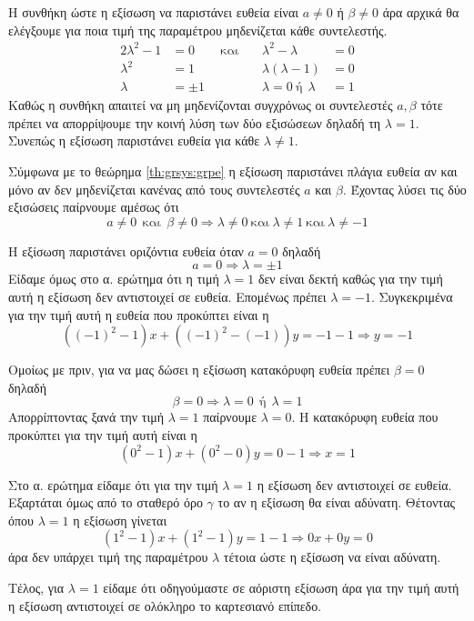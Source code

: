 \begin{alist}
\item Η συνθήκη ώστε η εξίσωση να παριστάνει ευθεία είναι $ a\neq 0 $ ή $ \beta\neq 0 $ άρα αρχικά θα ελέγξουμε για ποια τιμή της παραμέτρου μηδενίζεται κάθε συντελεστής.
\begin{alignat*}{2}
\lambda^2-1&= 0\qquad\textrm{και}\quad&\lambda^2-\lambda&= 0\\
\lambda^2&= 1&\lambda(\lambda-1)&= 0\\
\lambda&=\pm 1&\lambda= 0\ \textrm{ή}\ \  \lambda&= 1
\end{alignat*}
Καθώς η συνθήκη απαιτεί να μη μηδενίζονται συγχρόνως οι συντελεστές $ a,\beta $ τότε πρέπει να απορρίψουμε την κοινή λύση των δύο εξισώσεων δηλαδή τη $ \lambda=1 $. Συνεπώς η εξίσωση παριστάνει ευθεία για κάθε $ \lambda\neq 1 $.
\item Σύμφωνα με το θεώρημα \ref{th:grsys:grpe} η εξίσωση παριστάνει πλάγια ευθεία αν και μόνο αν δεν μηδενίζεται κανένας από τους συντελεστές $ a $ και $ \beta $. Έχοντας λύσει τις δύο εξισώσεις παίρνουμε αμέσως ότι
\[ a\neq 0\ \ \textrm{και}\ \ \beta\neq 0\Rightarrow \lambda\neq 0\ \textrm{και}\ \lambda\neq 1\ \textrm{και}\ \lambda\neq -1 \]
\item Η εξίσωση παριστάνει οριζόντια ευθεία όταν $ a=0 $ δηλαδή
\[ a=0\Rightarrow \lambda=\pm 1 \]
Είδαμε όμως στο α. ερώτημα ότι η τιμή $ \lambda=1 $ δεν είναι δεκτή καθώς για την τιμή αυτή η εξίσωση δεν αντιστοιχεί σε ευθεία. Επομένως πρέπει $ \lambda=-1 $. Συγκεκριμένα για την τιμή αυτή η ευθεία που προκύπτει είναι η
\[ \left((-1)^2-1\right)x+\left((-1)^2-(-1)\right)y =-1-1\Rightarrow y=-1 \]
\item Ομοίως με πριν, για να μας δώσει η εξίσωση κατακόρυφη ευθεία πρέπει $ \beta=0 $ δηλαδή
\[ \beta=0\Rightarrow \lambda=0\ \ \textrm{ή}\ \ \lambda=1 \]
Απορρίπτοντας ξανά την τιμή $ \lambda=1 $ παίρνουμε $ \lambda=0 $. Η κατακόρυφη ευθεία που προκύπτει για την τιμή αυτή είναι η 
\[ \left(0^2-1\right)x+\left(0^2-0\right)y =0-1\Rightarrow x=1 \]
\item Στο α. ερώτημα είδαμε ότι για την τιμή $ \lambda=1 $ η εξίσωση δεν αντιστοιχεί σε ευθεία. Εξαρτάται όμως από το σταθερό όρο $ \gamma $ το αν η εξίσωση θα είναι αδύνατη. Θέτοντας όπου $ \lambda=1 $ η εξίσωση γίνεται
\[ \left(1^2-1\right)x+\left(1^2-1\right)y =1-1\Rightarrow 0x+0y=0 \]
άρα δεν υπάρχει τιμή της παραμέτρου $ \lambda $ τέτοια ώστε η εξίσωση να είναι αδύνατη.
\item Τέλος, για $ \lambda=1 $ είδαμε ότι οδηγούμαστε σε αόριστη εξίσωση άρα για την τιμή αυτή η εξίσωση αντιστοιχεί σε ολόκληρο το καρτεσιανό επίπεδο.
\end{alist}

